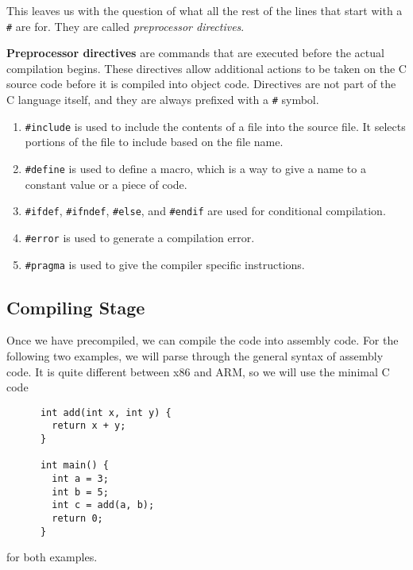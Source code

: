     This leaves us with the question of what all the rest of the lines that start with a \texttt{\#} are for. They are called \textit{preprocessor directives}.

    \begin{definition}
      \textbf{Preprocessor directives} are commands that are executed before the actual compilation begins. These directives allow additional actions to be taken on the C source code before it is compiled into object code. Directives are not part of the C language itself, and they are always prefixed with a \texttt{\#} symbol. 
      \begin{enumerate}
        \item \texttt{\#include} is used to include the contents of a file into the source file. It selects portions of the file to include based on the file name.
        \item \texttt{\#define} is used to define a macro, which is a way to give a name to a constant value or a piece of code. 
        \item \texttt{\#ifdef}, \texttt{\#ifndef}, \texttt{\#else}, and \texttt{\#endif} are used for conditional compilation. 
        \item \texttt{\#error} is used to generate a compilation error. 
        \item \texttt{\#pragma} is used to give the compiler specific instructions. 
      \end{enumerate}
    \end{definition}

  \subsection{Compiling Stage} 

    Once we have precompiled, we can compile the code into assembly code. For the following two examples, we will parse through the general syntax of assembly code. It is quite different between x86 and ARM, so we will use the minimal C code 
    \begin{lstlisting}
      int add(int x, int y) {
        return x + y;
      }

      int main() {
        int a = 3;
        int b = 5; 
        int c = add(a, b);
        return 0; 
      }
    \end{lstlisting}
    for both examples. 

